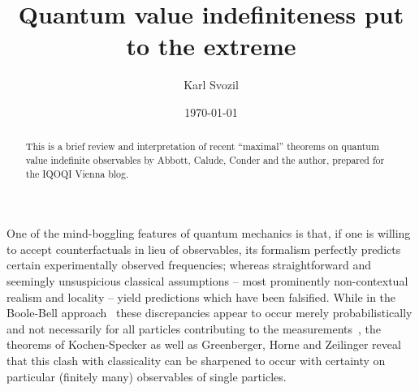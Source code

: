 \documentclass[%
 superscriptaddress,
 preprint,
 showpacs,
 showkeys,
 nofootinbib,
  amsmath,amssymb,
  aps,
  longbibliography,
  floatfix,
 ]{revtex4-1}
\theoremstyle{definition}
\begin{document}
\title{Quantum value indefiniteness put to the extreme}

\author{Karl Svozil}



\date{\today}

\begin{abstract}
This is a brief review and interpretation of  recent ``maximal'' theorems on quantum value indefinite observables by Abbott, Calude, Conder and the author,
prepared for the IQOQI Vienna blog.
\end{abstract}


\maketitle

One of the mind-boggling features of quantum mechanics is that,
if one is willing to accept counterfactuals in lieu of observables, its formalism
perfectly predicts certain experimentally observed frequencies; whereas
straightforward and seemingly unsuspicious classical assumptions
-- most prominently non-contextual realism and locality -- yield predictions which have been falsified.
While in the Boole-Bell approach~\cite{Pit-94} these discrepancies appear to occur merely probabilistically
and not necessarily for all particles contributing to the measurements~\cite{peres222},
the theorems of Kochen-Specker as well as
Greenberger, Horne and Zeilinger reveal that this clash with classicality can be sharpened to occur with certainty
on particular (finitely many) observables of single particles.
\end{document}
